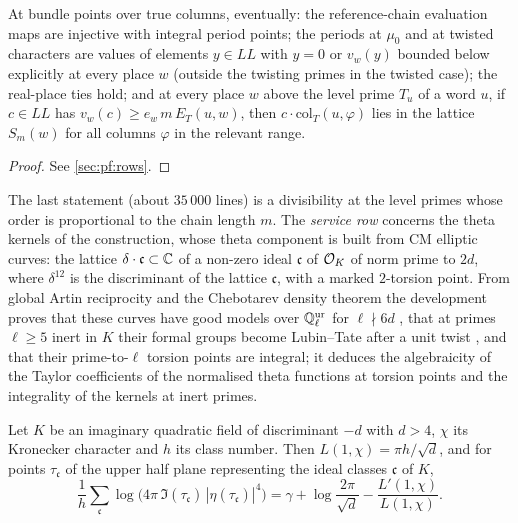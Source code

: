 \begin{proposition}\Fmark\label{prop:families:periods}
At bundle points over true columns, eventually: the reference-chain evaluation maps are injective with integral
period points; the periods at $\mu_0$ and at twisted characters are values of elements $y\in\mathit{LL}$ with
$y=0$ or $v_w(y)$ bounded below explicitly at every place $w$ (outside the twisting primes in the twisted case);
the real-place ties hold; and at every place $w$
above the level prime $T_u$ of a word $u$, if $c\in\mathit{LL}$ has $v_w(c)\ge e_w\,m\,E_T(u,w)$, then
$c\cdot\mathrm{col}_T(u,\varphi)$ lies in the lattice $S_m(w)$ for all columns $\varphi$ in the relevant range.
\end{proposition}
\begin{proof}See \cref{sec:pf:rows}.
\end{proof}


The last statement (about $35\,000$ lines) is a divisibility at the level primes whose order is proportional to
the chain length $m$. The \emph{service row} concerns the theta kernels of the construction, whose theta
component is built from CM elliptic curves: the lattice $\delta\cdot\mathfrak c\subset\mathbb{C}$ of a non-zero ideal
$\mathfrak c$ of $\mathcal{O}_K$ of norm prime to $2d$, where $\delta^{12}$ is the discriminant of the lattice
$\mathfrak c$, with a marked $2$-torsion point. From global Artin reciprocity and the Chebotarev density theorem
the development proves that these curves have good models over $\mathbb{Q}_\ell^{\mathrm{ur}}$ for $\ell\nmid6d$
\cite{Deuring1941,SerreTate1968,Shimura1971}, that at primes $\ell\ge5$ inert in $K$ their formal groups become
Lubin--Tate after a unit twist \cite{Honda1970}, and that their prime-to-$\ell$ torsion points are integral; it
deduces the algebraicity of the Taylor coefficients of the normalised theta functions at torsion points and the
integrality of the kernels at inert primes.

\begin{proposition}\Fmark\label{prop:families:cs}
Let $K$ be an imaginary quadratic field of discriminant $-d$ with $d>4$, $\chi$ its Kronecker character and
$h$ its class number. Then $L(1,\chi)=\pi h/\sqrt d$, and for points $\tau_{\mathfrak c}$ of the upper half plane
representing the ideal classes $\mathfrak c$ of $K$,
\[
\frac1h\sum_{\mathfrak c}\log\bigl(4\pi\,\Im(\tau_{\mathfrak c})\,|\eta(\tau_{\mathfrak c})|^4\bigr)
=\gamma+\log\frac{2\pi}{\sqrt d}-\frac{L'(1,\chi)}{L(1,\chi)} .
\]
\end{proposition}

